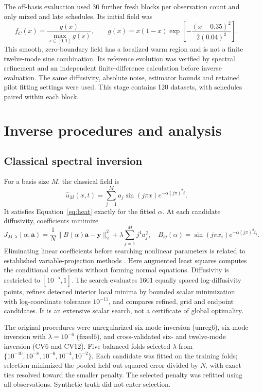\documentclass[11pt,a4paper]{article}
\begin{document}
The off-basis evaluation used 30 further fresh blocks per observation count and only mixed and late schedules. Its initial field was
\begin{equation}
 f_C(x)=\frac{g(x)}{\max_{s\in[0,1]}g(s)},\qquad
 g(x)=x(1-x)\exp\left[-\frac{(x-0.35)^2}{2(0.04)^2}\right].
\label{eq:localized}
\end{equation}
This smooth, zero-boundary field has a localized warm region and is not a finite twelve-mode sine combination. Its reference evolution was verified by spectral refinement and an independent finite-difference calculation before inverse evaluation. The same diffusivity, absolute noise, estimator bounds and retained pilot fitting settings were used. This stage contains 120 datasets, with schedules paired within each block.

\section{Inverse procedures and analysis}
\subsection{Classical spectral inversion}
For a basis size $M$, the classical field is
\begin{equation}
 \widehat u_M(x,t)=\sum_{j=1}^{M} a_j\sin(j\pi x)e^{-\alpha(j\pi)^2t}.
\end{equation}
It satisfies Equation~\eqref{eq:heat} exactly for the fitted $\alpha$. At each candidate diffusivity, coefficients minimize
\begin{equation}
 J_{M,\lambda}(\alpha,\boldsymbol a)
 =\frac{1}{N}\|B(\alpha)\boldsymbol a-\boldsymbol y\|_2^2
 +\lambda\sum_{j=1}^{M}j^4a_j^2,
 \quad B_{ij}(\alpha)=\sin(j\pi x_i)e^{-\alpha(j\pi)^2t_i}.
\label{eq:ridge}
\end{equation}
Eliminating linear coefficients before searching nonlinear parameters is related to established variable-projection methods \citep{ref020,ref021}. Here augmented least squares computes the conditional coefficients without forming normal equations. Diffusivity is restricted to $[10^{-5},1]$. The search evaluates 1601 equally spaced log-diffusivity points, refines detected interior local minima by bounded scalar minimization with log-coordinate tolerance $10^{-11}$, and compares refined, grid and endpoint candidates. It is an extensive scalar search, not a certificate of global optimality.

The original procedures were unregularized six-mode inversion (unreg6), six-mode inversion with $\lambda=10^{-6}$ (fixed6), and cross-validated six- and twelve-mode inversion (CV6 and CV12). Five balanced folds selected $\lambda$ from $\{10^{-10},10^{-8},10^{-6},10^{-4},10^{-2}\}$. Each candidate was fitted on the training folds; selection minimized the pooled held-out squared error divided by $N$, with exact ties resolved toward the smaller penalty. The selected penalty was refitted using all observations. Synthetic truth did not enter selection.
\end{document}
